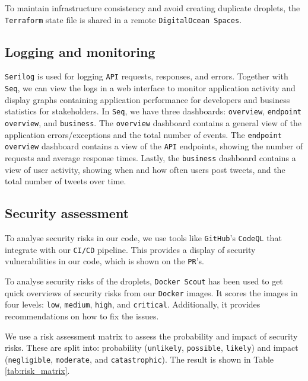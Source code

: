 To maintain infrastructure consistency and avoid creating duplicate droplets,
the \texttt{Terraform} state file is shared in a remote \texttt{DigitalOcean Spaces}.

\subsection{Logging and monitoring}
\texttt{Serilog} is used for logging \texttt{API} requests, responses, and errors.
Together with \texttt{Seq}, we can view the logs in a web interface to monitor 
application activity and display graphs containing application performance 
for developers and business statistics for stakeholders.
In \texttt{Seq}, we have three dashboards: \texttt{overview}, \texttt{endpoint overview}, and \texttt{business}.
The \texttt{overview} dashboard contains a general view of the application 
errors/exceptions and the total number of events.
The \texttt{endpoint overview} dashboard contains a view of the \texttt{API} endpoints,
showing the number of requests and average response times.
Lastly, the \texttt{business} dashboard contains a view of user activity,
showing when and how often users post tweets, and the total number of tweets over time.


\subsection{Security assessment}
To analyse security risks in our code, 
we use tools like \texttt{GitHub}'s \texttt{CodeQL}\cite{codeql} that 
integrate with our \texttt{CI/CD} pipeline.
This provides a display of security vulnerabilities in our code,
which is shown on the \texttt{PR}'s.

To analyse security risks of the droplets, \texttt{Docker Scout} has been used to get
quick overviews of security risks from our \texttt{Docker} images.
It scores the images in four levels: \texttt{low}, \texttt{medium}, \texttt{high}, and \texttt{critical}.
Additionally, it provides recommendations on how to fix the issues.

We use a risk assessment matrix to assess the probability and impact of security risks. 
These are split into: probability (\texttt{unlikely}, \texttt{possible}, \texttt{likely}) 
and impact (\texttt{negligible}, \texttt{moderate}, and \texttt{catastrophic}).
The result is shown in Table \ref{tab:risk_matrix}.

